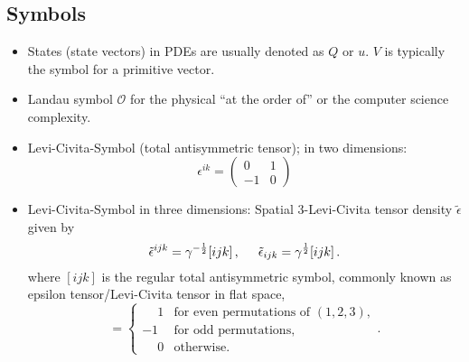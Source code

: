\subsection{Symbols}\label{apx:symbols}
\begin{itemize}
    \item States (state vectors) in PDEs are usually denoted as $Q$ or $u$.
      $V$ is typically the symbol for a primitive vector.
    \item Landau symbol $\mathcal O$ for the physical ``at the 
      order of'' or the computer science complexity.
	\item Levi-Civita-Symbol (total antisymmetric tensor);
	  in two dimensions:
	  \begin{equation}
	  \epsilon^{ik} = \begin{pmatrix} 0 & 1 \\  -1 & 0 
	  \end{pmatrix}
	  \end{equation}
	\item Levi-Civita-Symbol in three dimensions: Spatial 3-Levi-Civita tensor
  	 density $\tilde{\epsilon}$ given by
	 \begin{equation}
	 \tilde{\epsilon}^{ijk} = \gamma^{-\frac{1}{2}} [ijk]\,, \hspace{0.5cm}
	 \tilde{\epsilon}_{ijk} = \gamma^{\frac{1}{2}} [ijk]\,. \\
	 \end{equation}
	 where 
	 $[ijk]$ is the regular total antisymmetric symbol, commonly known as
	 epsilon tensor/Levi-Civita tensor in flat space,
	 \begin{equation}
	 [ijk] = \begin{cases}
      \phantom{-}1 & \text{for even	permutations of $(1,2,3)$}, 
      \\
	 -1 & \text{for odd permutations}, 
	 \\
	 \phantom{-}0 &  \text{otherwise.}
	 \end{cases}.
	 \end{equation}
	

\end{itemize}
